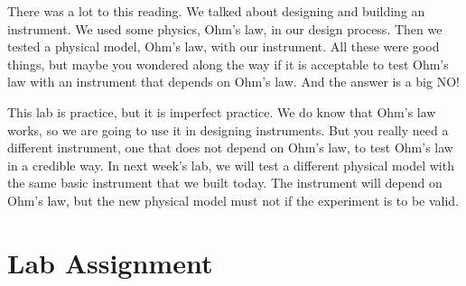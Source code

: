 There was a lot to this reading. We talked about designing and building an
instrument. We used some physics, Ohm's law, in our design process. Then we
tested a physical model, Ohm's law, with our instrument. All these were good things, but maybe you wondered along the way if it is acceptable to test Ohm's law with an instrument that depends on Ohm's law. And the answer is a big NO!

This lab is practice, but it is imperfect practice. We do know that Ohm's
law works, so we are going to use it in designing instruments. But you
really need a different instrument, one that does not depend on Ohm's law,
to test Ohm's law in a credible way. In next week's lab, we will test a
different physical model with the same basic instrument that we built today. The instrument will depend on Ohm's law, but the new physical model must not if the experiment is to be valid.




\section{Lab Assignment}

